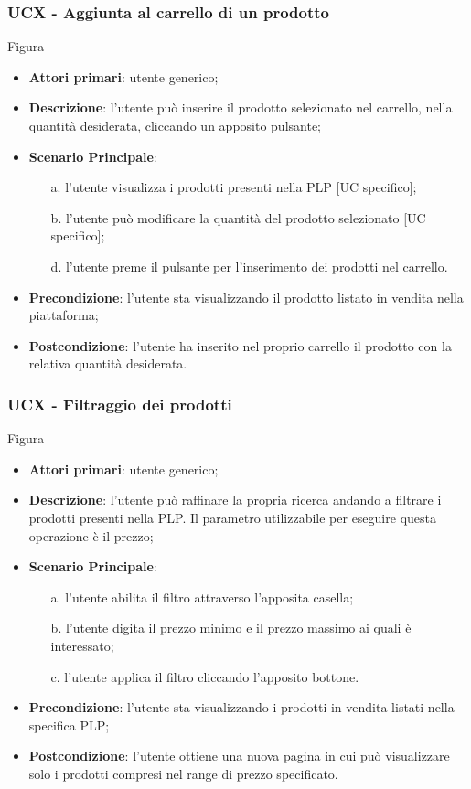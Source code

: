 \subsubsection{UCX - Aggiunta al carrello di un prodotto}
Figura \\
\begin{itemize}
\item \textbf{Attori primari}: utente generico;
\item \textbf{Descrizione}: l'utente può inserire il prodotto selezionato nel carrello, nella quantità desiderata, cliccando un apposito pulsante;
\item \textbf{Scenario Principale}:
\begin{enumerate}
\item[a.] l'utente visualizza i prodotti presenti nella PLP [UC specifico];
\item[b.] l'utente può modificare la quantità del prodotto selezionato [UC specifico];
\item[d.] l'utente preme il pulsante per l'inserimento dei prodotti nel carrello.
\end{enumerate}
\item \textbf{Precondizione}: l'utente sta visualizzando il prodotto listato in vendita nella piattaforma;
\item \textbf{Postcondizione}: l'utente ha inserito nel proprio carrello il prodotto con la relativa quantità desiderata.
\end{itemize}
\subsubsection{UCX - Filtraggio dei prodotti}
Figura \\
\begin{itemize}
\item \textbf{Attori primari}: utente generico;
\item \textbf{Descrizione}: l'utente può raffinare la propria ricerca andando a filtrare i prodotti presenti nella PLP. Il parametro utilizzabile per eseguire questa operazione è il prezzo;
\item \textbf{Scenario Principale}:
\begin{enumerate}
\item[a.] l'utente abilita il filtro attraverso l'apposita casella;
\item[b.] l'utente digita il prezzo minimo e il prezzo massimo ai quali è interessato;
\item[c.] l'utente applica il filtro cliccando l'apposito bottone.
\end{enumerate}
\item \textbf{Precondizione}: l'utente sta visualizzando i prodotti in vendita listati nella specifica PLP;
\item \textbf{Postcondizione}: l'utente ottiene una nuova pagina in cui può visualizzare solo i prodotti compresi nel range di prezzo specificato.
\end{itemize}

